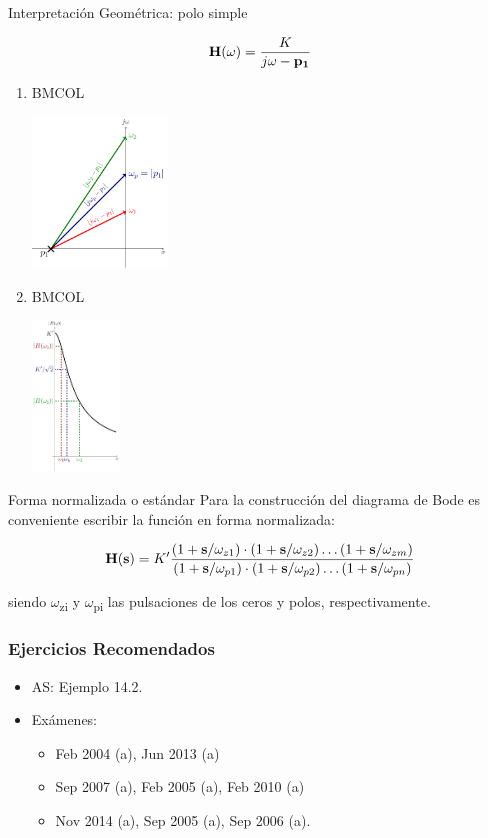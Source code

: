 {Interpretación Geométrica: polo simple}
\label{sec:orge2be957}

\[
  \mathbf{H}(\omega) = \frac{K}{j\omega - \mathbf{p_1}}
\]

\begin{enumerate}
\item \hfill{}\textsc{BMCOL}
\label{sec:org056cb29}
\begin{center}
\includegraphics[height=4cm]{../figs/PoloGeometrica.pdf}
\end{center}

\item \hfill{}\textsc{BMCOL}
\label{sec:org05737f5}
\begin{center}
\includegraphics[height=4cm]{../figs/PoloGeometricaPlot.pdf}
\end{center}
\end{enumerate}

{Forma normalizada o estándar}
\label{sec:orgd549f3c}
Para la construcción del diagrama de Bode es conveniente escribir la función en forma normalizada:

\[
  \mathbf{H}(\mathbf{s}) = K' \frac{(1 + \mathbf{s}/\omega_{z1}) \cdot (1 + \mathbf{s}/\omega_{z2}) \ldots (1 + \mathbf{s}/\omega_{zm})}{(1 + \mathbf{s}/\omega_{p1}) \cdot (1 + \mathbf{s}/\omega_{p2}) \ldots (1 + \mathbf{s}/\omega_{pn})} 
\]

siendo \(\omega\)\textsubscript{zi} y \(\omega\)\textsubscript{pi} las pulsaciones de los ceros y polos, respectivamente.

\subsubsection{Ejercicios Recomendados}
\label{sec:org3a18fb7}
\begin{itemize}
\item AS: Ejemplo 14.2.
\item Exámenes:
\begin{itemize}
\item Feb 2004 (a), Jun 2013 (a)
\item Sep 2007 (a), Feb 2005 (a), Feb 2010 (a)
\item Nov 2014 (a), Sep 2005 (a), Sep 2006 (a).
\end{itemize}
\end{itemize}

